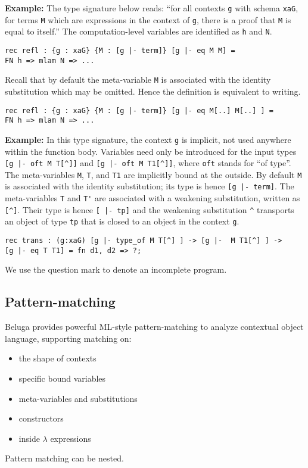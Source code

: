 \documentclass[11pt]{article}
\begin{document}
\textbf{Example:} The type signature below reads: ``for all contexts
\texttt{g} with schema \texttt{xaG}, for terms \texttt{M} which are
expressions in the context of \texttt{g}, there is a proof that
\texttt{M} is equal to itself.'' The computation-level variables are
identified as \texttt{h} and \texttt{N}. 

\begin{verbatim}
rec refl : {g : xaG} {M : [g |- term]} [g |- eq M M] =
FN h => mlam N => ...
\end{verbatim}

Recall that by default
the meta-variable \verb+M+ is associated with the identity
substitution which may be omitted. Hence the definition is equivalent to writing.


\begin{verbatim}
rec refl : {g : xaG} {M : [g |- term]} [g |- eq M[..] M[..] ] =
FN h => mlam N => ...
\end{verbatim}



\textbf{Example:} In this type signature, the context \texttt{g} is
implicit, not used anywhere within the function body. Variables need
only be introduced for the input types \verb+[g |- oft M T[^]]+ and
\verb+[g |- oft M T1[^]]+, where \texttt{oft} stands for ``of
type''. The meta-variables \texttt{M}, \texttt{T}, and \texttt{T1} are implicitly
bound at the outside. By default \verb+M+ is associated with the
identity substitution; its type is hence \verb+[g |- term]+. The
meta-variables \verb+T+ and \verb+T'+ are associated with a weakening
substitution, written as \verb+[^]+. Their type is hence
 \verb+[ |- tp]+ and the weakening substitution \verb+^+ transports an
 object of type \verb+tp+ that is closed to an object in the context \verb+g+.

\begin{verbatim}
rec trans : (g:xaG) [g |- type_of M T[^] ] -> [g |-  M T1[^] ] -> 
[g |- eq T T1] = fn d1, d2 => ?;
\end{verbatim}

We use the question mark to denote an incomplete program.

\subsection{Pattern-matching}
Beluga provides powerful ML-style pattern-matching to analyze contextual object language, supporting matching on:
\begin{itemize}
\item the shape of contexts
\item specific bound variables
\item meta-variables and substitutions
\item constructors
\item inside $\lambda$ expressions
\end{itemize}
Pattern matching can be nested.
\end{document}
